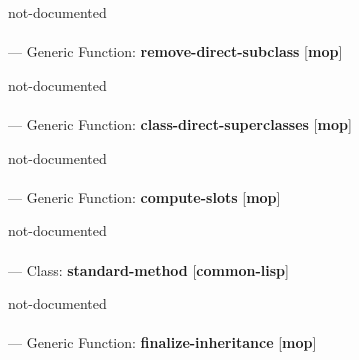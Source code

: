 \begin{adjustwidth}{5em}{5em}
not-documented
\end{adjustwidth}

\paragraph{}
\label{MOP:REMOVE-DIRECT-SUBCLASS}
--- Generic Function: \textbf{remove-direct-subclass} [\textbf{mop}] \textit{}

\begin{adjustwidth}{5em}{5em}
not-documented
\end{adjustwidth}

\paragraph{}
\label{MOP:CLASS-DIRECT-SUPERCLASSES}
--- Generic Function: \textbf{class-direct-superclasses} [\textbf{mop}] \textit{}

\begin{adjustwidth}{5em}{5em}
not-documented
\end{adjustwidth}

\paragraph{}
\label{MOP:COMPUTE-SLOTS}
--- Generic Function: \textbf{compute-slots} [\textbf{mop}] \textit{}

\begin{adjustwidth}{5em}{5em}
not-documented
\end{adjustwidth}

\paragraph{}
\label{COMMON-LISP:STANDARD-METHOD}
--- Class: \textbf{standard-method} [\textbf{common-lisp}] \textit{}

\begin{adjustwidth}{5em}{5em}
not-documented
\end{adjustwidth}

\paragraph{}
\label{MOP:FINALIZE-INHERITANCE}
--- Generic Function: \textbf{finalize-inheritance} [\textbf{mop}] \textit{}


